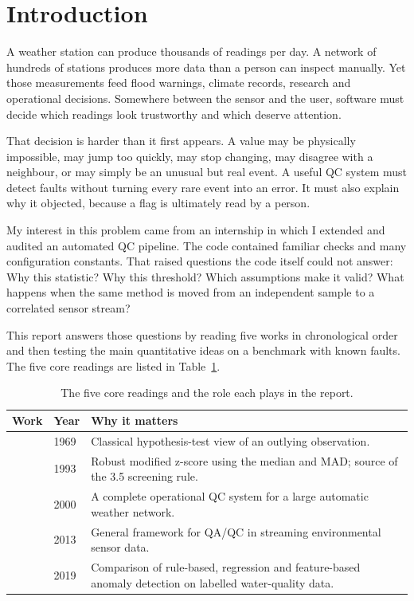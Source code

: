 
\section{Introduction}
\label{sec:intro}

A weather station can produce thousands of readings per day. A network of
hundreds of stations produces more data than a person can inspect manually.
Yet those measurements feed flood warnings, climate records, research and
operational decisions. Somewhere between the sensor and the user, software
must decide which readings look trustworthy and which deserve attention.

That decision is harder than it first appears. A value may be physically
impossible, may jump too quickly, may stop changing, may disagree with a
neighbour, or may simply be an unusual but real event. A useful QC system
must detect faults without turning every rare event into an error. It must
also explain why it objected, because a flag is ultimately read by a person.

My interest in this problem came from an internship in which I extended and
audited an automated QC pipeline. The code contained familiar checks and
many configuration constants. That raised questions the code itself could
not answer: Why this statistic? Why this threshold? Which assumptions make
it valid? What happens when the same method is moved from an independent
sample to a correlated sensor stream?

This report answers those questions by reading five works in chronological
order and then testing the main quantitative ideas on a benchmark with known
faults. The five core readings are listed in Table~\ref{tab:fiveworks}.

\begin{table}[h]
\centering
\small
\caption{The five core readings and the role each plays in the report.}
\label{tab:fiveworks}
\begin{tabular}{@{}p{3.5cm}p{1.2cm}p{8.7cm}@{}}
\toprule
Work & Year & Why it matters \\
\midrule
\citet{grubbs1969} & 1969 & Classical hypothesis-test view of an outlying observation. \\
\citet{iglewicz1993} & 1993 & Robust modified z-score using the median and MAD; source of the 3.5 screening rule. \\
\citet{shafer2000} & 2000 & A complete operational QC system for a large automatic weather network. \\
\citet{campbell2013} & 2013 & General framework for QA/QC in streaming environmental sensor data. \\
\citet{leigh2019} & 2019 & Comparison of rule-based, regression and feature-based anomaly detection on labelled water-quality data. \\
\bottomrule
\end{tabular}
\end{table}

